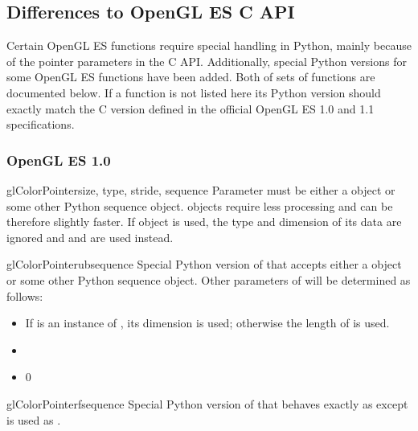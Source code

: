 \subsection{Differences to OpenGL ES C API}
\label{subsec:differences}

Certain OpenGL ES functions require special handling in Python, mainly because
of the pointer parameters in the C API. Additionally, special Python versions for
some OpenGL ES functions have been added. Both of sets of functions are
documented below. If a function is not listed here its Python version should
exactly match the C version defined in the official OpenGL ES 1.0 and 1.1
specifications.

\subsubsection{OpenGL ES 1.0}

\begin{funcdesc}{glColorPointer}{size, type, stride, sequence}
Parameter  must be either a  object or some other
Python sequence object.  objects require less processing and can
be therefore slightly faster. If  object is used, the type and
dimension of its data are ignored and  and  are used
instead.
\end{funcdesc}

\begin{funcdesc}{glColorPointerub}{sequence}
Special Python version of  that accepts either a
 object or some other Python sequence object. Other parameters
of  will be determined as follows:
\begin{itemize}
\item {} If  is an instance of , its dimension is used; otherwise the length of  is used.
\item {} 
\item {} 0
\end{itemize}
\end{funcdesc}

\begin{funcdesc}{glColorPointerf}{sequence}
Special Python version of  that behaves exactly as
 except  is used as .
\end{funcdesc}

